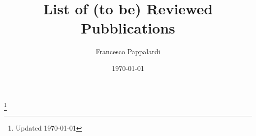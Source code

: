 \documentclass[12pt]{amsart}
\begin{document}
\title[Reviewed Pubblications]{List of (to be) Reviewed Pubblications}%
\author{Francesco Pappalardi}
\address{Dipartimento di Matematica, Universit\`{a} Roma Tre,
Largo S. L. Murialdo, 1, I--00191, Roma ITALIA}

\thanks{Updated \today}%
%
%

\date{\today}%
\vspace*{-2cm} \maketitle \thispagestyle{empty} \nocite{*}
\vspace*{-.5cm}

\end{document}
